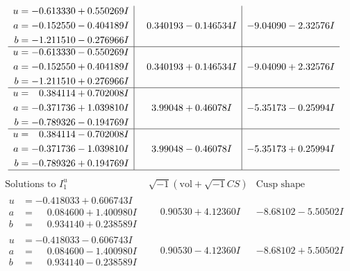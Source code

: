 \documentclass[1p]{elsarticle_modified}
\theoremstyle{definition}
\newcommand{\I}{\sqrt{-1}}
\begin{document}
$$\begin{array}{c|c|c}
\begin{aligned}
u &= -0.613330 + 0.550269 I \\
a &= -0.152550 - 0.404189 I \\
b &= -1.211510 - 0.276966 I\end{aligned}
 & \phantom{-}0.340193 - 0.146534 I & -9.04090 - 2.32576 I \\ \hline\begin{aligned}
u &= -0.613330 - 0.550269 I \\
a &= -0.152550 + 0.404189 I \\
b &= -1.211510 + 0.276966 I\end{aligned}
 & \phantom{-}0.340193 + 0.146534 I & -9.04090 + 2.32576 I \\ \hline\begin{aligned}
u &= \phantom{-}0.384114 + 0.702008 I \\
a &= -0.371736 + 1.039810 I \\
b &= -0.789326 - 0.194769 I\end{aligned}
 & \phantom{-}3.99048 + 0.46078 I & -5.35173 - 0.25994 I \\ \hline\begin{aligned}
u &= \phantom{-}0.384114 - 0.702008 I \\
a &= -0.371736 - 1.039810 I \\
b &= -0.789326 + 0.194769 I\end{aligned}
 & \phantom{-}3.99048 - 0.46078 I & -5.35173 + 0.25994 I\\
 \hline 
 \end{array}$$\newpage$$\begin{array}{c|c|c}  
\text{Solutions to }I^u_{1}& \I (\text{vol} + \sqrt{-1}CS) & \text{Cusp shape}\\
 \hline 
\begin{aligned}
u &= -0.418033 + 0.606743 I \\
a &= \phantom{-}0.084600 + 1.400980 I \\
b &= \phantom{-}0.934140 + 0.238589 I\end{aligned}
 & \phantom{-}0.90530 + 4.12360 I & -8.68102 - 5.50502 I \\ \hline\begin{aligned}
u &= -0.418033 - 0.606743 I \\
a &= \phantom{-}0.084600 - 1.400980 I \\
b &= \phantom{-}0.934140 - 0.238589 I\end{aligned}
 & \phantom{-}0.90530 - 4.12360 I & -8.68102 + 5.50502 I \\ \hline\begin{aligned}

\end{aligned}
\end{array}$$
\end{document}
